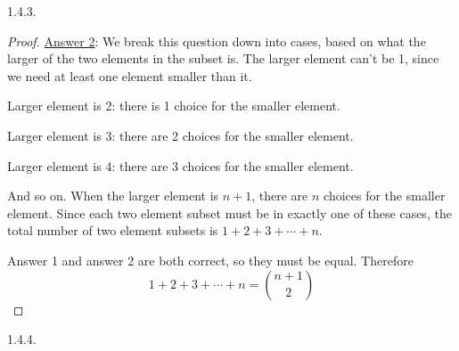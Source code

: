 \begin {itemize}
\begin{ans}{1.4.3.}
\begin{proof}
        \underline{Answer 2}: We break this question down into cases, based on what the larger of the two elements in the subset is. The larger element can't be 1, since we need at least one element smaller than it.

        Larger element is 2: there is 1 choice for the smaller element.

        Larger element is 3: there are 2 choices for the smaller element.

        Larger element is 4: there are 3 choices for the smaller element.

        And so on.  When the larger element is $n+1$, there are $n$ choices for the smaller element.  Since each two element subset must be in exactly one of these cases, the total number of two element subsets is $1 + 2 + 3 + \cdots + n$.

        Answer 1 and answer 2 are both correct, so they must be equal.  Therefore
        \[1 + 2 + 3 + \cdots + n = {n+1 \choose 2}\]
       \end{proof}
	
\end{ans}
\begin{ans}{1.4.4.}
	

\end{ans}
\end{itemize}
